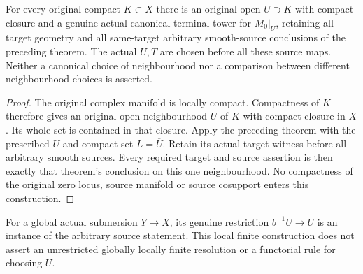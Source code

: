 \begin{theorem}
\label{hir:original-local-canonical-principalization-compact-neighbourhood}
\leanok
For every original compact $K\subset X$ there is an original open
$U\supset K$ with compact closure and a genuine actual canonical
terminal tower for $M_0|_U$, retaining all target geometry and all
same-target arbitrary smooth-source conclusions of the preceding
theorem. The actual $U,T$ are chosen before all these source maps.
Neither a canonical choice of neighbourhood nor a comparison between
different neighbourhood choices is asserted.
\end{theorem}
\begin{proof}
The original complex manifold is locally compact. Compactness of $K$
therefore gives an original open neighbourhood $U$ of $K$ with compact
closure in $X$. Its whole set is contained in that closure. Apply the
preceding theorem with the prescribed $U$ and compact set $L=\overline U$.
Retain its actual target witness before all arbitrary smooth sources.
Every required target and source assertion is then exactly that theorem's
conclusion on this one neighbourhood. No compactness of the original
zero locus, source manifold or source cosupport enters this construction.
\end{proof}

For a global actual submersion $Y\to X$, its genuine restriction
$b^{-1}U\to U$ is an instance of the arbitrary source statement.
This local finite construction does not assert an unrestricted globally
locally finite resolution or a functorial rule for choosing $U$.
